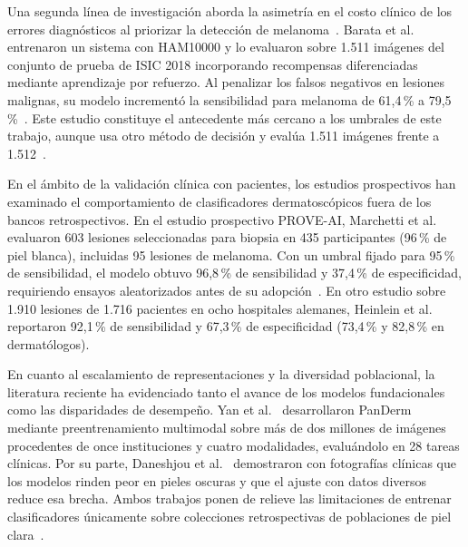 Una segunda línea de investigación aborda la asimetría en el costo clínico de los errores diagnósticos al priorizar la detección de melanoma~\cite{barata2023reinforcement}. Barata et al.~\cite{barata2023reinforcement} entrenaron un sistema con HAM10000 y lo evaluaron sobre 1.511 imágenes del conjunto de prueba de ISIC 2018 incorporando recompensas diferenciadas mediante aprendizaje por refuerzo. Al penalizar los falsos negativos en lesiones malignas, su modelo incrementó la sensibilidad para melanoma de 61,4\,\% a 79,5\,\%~\cite{barata2023reinforcement}. Este estudio constituye el antecedente más cercano a los umbrales de este trabajo, aunque usa otro método de decisión y evalúa 1.511 imágenes frente a 1.512~\cite{barata2023reinforcement,codella2019isic2018}.

En el ámbito de la validación clínica con pacientes, los estudios prospectivos han examinado el comportamiento de clasificadores dermatoscópicos fuera de los bancos retrospectivos. En el estudio prospectivo PROVE-AI, Marchetti et al.~\cite{marchetti2023proveai} evaluaron 603 lesiones seleccionadas para biopsia en 435 participantes (96\,\% de piel blanca), incluidas 95 lesiones de melanoma. Con un umbral fijado para 95\,\% de sensibilidad, el modelo obtuvo 96,8\,\% de sensibilidad y 37,4\,\% de especificidad, requiriendo ensayos aleatorizados antes de su adopción~\cite{marchetti2023proveai}. En otro estudio sobre 1.910 lesiones de 1.716 pacientes en ocho hospitales alemanes, Heinlein et al.~\cite{heinlein2024multicenter} reportaron 92,1\,\% de sensibilidad y 67,3\,\% de especificidad (73,4\,\% y 82,8\,\% en dermatólogos).

En cuanto al escalamiento de representaciones y la diversidad poblacional, la literatura reciente ha evidenciado tanto el avance de los modelos fundacionales como las disparidades de desempeño. Yan et al.~\cite{yan2025panderm} desarrollaron PanDerm mediante preentrenamiento multimodal sobre más de dos millones de imágenes procedentes de once instituciones y cuatro modalidades, evaluándolo en 28 tareas clínicas. Por su parte, Daneshjou et al.~\cite{daneshjou2022disparities} demostraron con fotografías clínicas que los modelos rinden peor en pieles oscuras y que el ajuste con datos diversos reduce esa brecha. Ambos trabajos ponen de relieve las limitaciones de entrenar clasificadores únicamente sobre colecciones retrospectivas de poblaciones de piel clara~\cite{daneshjou2022disparities,yan2025panderm}.

